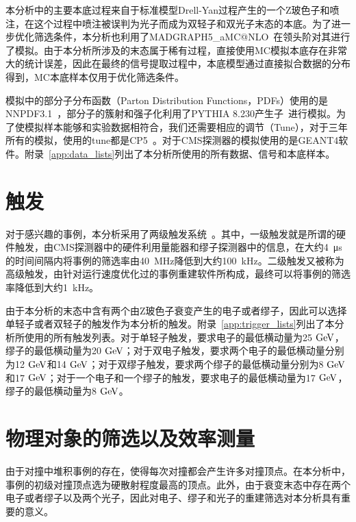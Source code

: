 本分析中的主要本底过程来自于标准模型Drell-Yan过程产生的一个Z玻色子和喷注，在这个过程中喷注被误判为光子而成为双轻子和双光子末态的本底。为了进一步优化筛选条件，本分析也利用了MADGRAPH5\_aMC@NLO~\cite{alwall2014automated, Alwall:2007fs, Frederix:2012ps}在领头阶对其进行了模拟。由于本分析所涉及的末态属于稀有过程，直接使用MC模拟本底存在非常大的统计误差，因此在最终的信号提取过程中，本底模型通过直接拟合数据的分布得到，MC本底样本仅用于优化筛选条件。

模拟中的部分子分布函数（Parton Distribution Functions，PDFs）使用的是NNPDF3.1~\cite{Ball:2017nwa}，部分子的簇射和强子化利用了PYTHIA 8.230产生子~\cite{Sjostrand:2014zea}进行模拟。为了使模拟样本能够和实验数据相符合，我们还需要相应的调节（Tune），对于三年所有的模拟，使用的tune都是CP5~\cite{Khachatryan:2015pea, Sirunyan:2019dfx}。对于CMS探测器的模拟使用的是GEANT4软件\cite{agostinelli2003geant4, 1610988}。附录~\ref{app:data_lists}列出了本分析所使用的所有数据、信号和本底样本。

\section{触发}\label{sec:Trigger}

对于感兴趣的事例，本分析采用了两级触发系统~\cite{Khachatryan:2016bia}。其中，一级触发就是所谓的硬件触发，由CMS探测器中的硬件利用量能器和缪子探测器中的信息，在大约4~\si{\us}的时间间隔内将事例的筛选率由40~\si{\MHz}降低到大约100~\si{\kHz}。二级触发又被称为高级触发，由针对运行速度优化过的事例重建软件所构成，最终可以将事例的筛选率降低到大约1~\si{kHz}。

由于本分析的末态中含有两个由Z玻色子衰变产生的电子或者缪子，因此可以选择单轻子或者双轻子的触发作为本分析的触发。附录~\ref{app:trigger_lists}列出了本分析所使用的所有触发列表。对于单轻子触发，要求电子的最低横动量为25$\GeV$，缪子的最低横动量为20$\GeV$；对于双电子触发，要求两个电子的最低横动量分别为12$\GeV$和14$\GeV$；对于双缪子触发，要求两个缪子的最低横动量分别为8$\GeV$和17$\GeV$；对于一个电子和一个缪子的触发，要求电子的最低横动量为17$\GeV$，缪子的最低横动量为8$\GeV$。

\section{物理对象的筛选以及效率测量}\label{sec:EventReco}

由于对撞中堆积事例的存在，使得每次对撞都会产生许多对撞顶点。在本分析中，事例的初级对撞顶点选为硬散射程度最高的顶点。此外，由于衰变末态中存在两个电子或者缪子以及两个光子，因此对电子、缪子和光子的重建筛选对本分析具有重要的意义。

